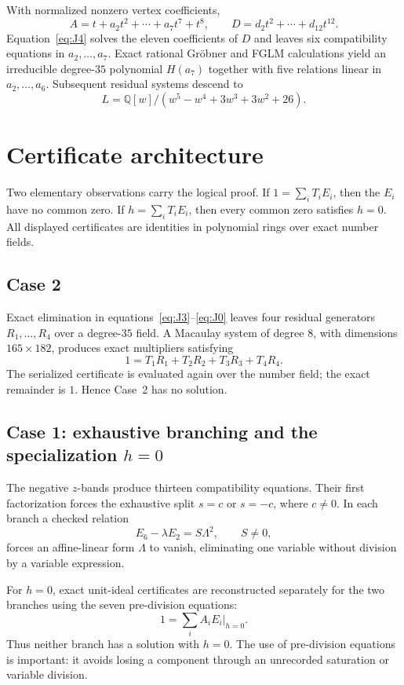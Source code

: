 \documentclass[11pt,a4paper]{article}
\theoremstyle{remark}
\newcommand{\Q}{\mathbb{Q}}
\begin{document}
With normalized nonzero vertex coefficients,
\[
A=t+a_2t^2+\cdots+a_7t^7+t^8,
\qquad D=d_2t^2+\cdots+d_{12}t^{12}.
\]
Equation~\eqref{eq:J4} solves the eleven coefficients of $D$ and leaves six compatibility equations in $a_2,\ldots,a_7$. Exact rational Gr\"obner and FGLM calculations yield an irreducible degree-$35$ polynomial $H(a_7)$ together with five relations linear in $a_2,\ldots,a_6$. Subsequent residual systems descend to
\[
L=\Q[w]/(w^5-w^4+3w^3+3w^2+26).
\]

\section{Certificate architecture}

Two elementary observations carry the logical proof. If $1=\sum_i T_iE_i$, then the $E_i$ have no common zero. If $h=\sum_iT_iE_i$, then every common zero satisfies $h=0$. All displayed certificates are identities in polynomial rings over exact number fields.

\subsection{Case 2}

Exact elimination in equations~\eqref{eq:J3}--\eqref{eq:J0} leaves four residual generators $R_1,\ldots,R_4$ over a degree-$35$ field. A Macaulay system of degree $8$, with dimensions $165\times182$, produces exact multipliers satisfying
\[
1=T_1R_1+T_2R_2+T_3R_3+T_4R_4.
\]
The serialized certificate is evaluated again over the number field; the exact remainder is $1$. Hence Case~2 has no solution.

\subsection{Case 1: exhaustive branching and the specialization $h=0$}

The negative $z$-bands produce thirteen compatibility equations. Their first factorization forces the exhaustive split $s=c$ or $s=-c$, where $c\neq0$. In each branch a checked relation
\[
E_6-\lambda E_2=S\Lambda^2,\qquad S\neq0,
\]
forces an affine-linear form $\Lambda$ to vanish, eliminating one variable without division by a variable expression.

For $h=0$, exact unit-ideal certificates are reconstructed separately for the two branches using the seven pre-division equations:
\[
1=\sum_i A_iE_i\big|_{h=0}.
\]
Thus neither branch has a solution with $h=0$. The use of pre-division equations is important: it avoids losing a component through an unrecorded saturation or variable division.
\end{document}
